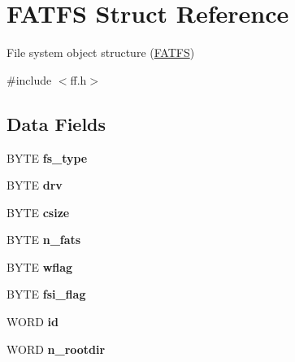 \hypertarget{structFATFS}{}\section{F\+A\+T\+FS Struct Reference}
\label{structFATFS}


File system object structure (\hyperlink{structFATFS}{F\+A\+T\+FS})  




{\ttfamily \#include $<$ff.\+h$>$}

\subsection*{Data Fields}
\begin{DoxyCompactItemize}
\item 
B\+Y\+TE {\bfseries fs\+\_\+type}\hypertarget{structFATFS_add27d97babe807b573eac98a71dc4ae5}{}\label{structFATFS_add27d97babe807b573eac98a71dc4ae5}

\item 
B\+Y\+TE {\bfseries drv}\hypertarget{structFATFS_a6a791560e2687e8b1569bfce61208d2d}{}\label{structFATFS_a6a791560e2687e8b1569bfce61208d2d}

\item 
B\+Y\+TE {\bfseries csize}\hypertarget{structFATFS_a504a1175f6dcc9a854b9da94463bd108}{}\label{structFATFS_a504a1175f6dcc9a854b9da94463bd108}

\item 
B\+Y\+TE {\bfseries n\+\_\+fats}\hypertarget{structFATFS_a56716c7e7ac10cf46e73ffb2a2e9b545}{}\label{structFATFS_a56716c7e7ac10cf46e73ffb2a2e9b545}

\item 
B\+Y\+TE {\bfseries wflag}\hypertarget{structFATFS_a647e43c9ccae94b7274793d1909897de}{}\label{structFATFS_a647e43c9ccae94b7274793d1909897de}

\item 
B\+Y\+TE {\bfseries fsi\+\_\+flag}\hypertarget{structFATFS_a84e9cdc5a6a8e33ea7ec192058abf161}{}\label{structFATFS_a84e9cdc5a6a8e33ea7ec192058abf161}

\item 
W\+O\+RD {\bfseries id}\hypertarget{structFATFS_a417095d7c20d56d417dc0998e0dd5a5c}{}\label{structFATFS_a417095d7c20d56d417dc0998e0dd5a5c}

\item 
W\+O\+RD {\bfseries n\+\_\+rootdir}\hypertarget{structFATFS_a189a00aa038044ffad0fc7f7dcf2aae1}{}\label{structFATFS_a189a00aa038044ffad0fc7f7dcf2aae1}


\end{DoxyCompactItemize}
